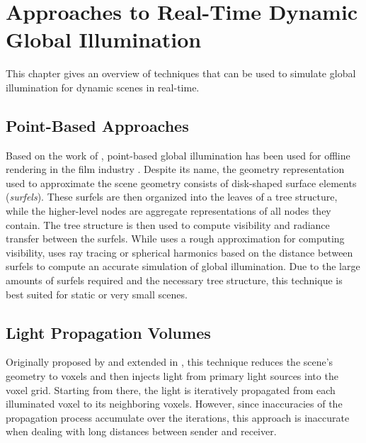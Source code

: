 
\chapter{Approaches to Real-Time Dynamic Global Illumination}

This chapter gives an overview of techniques that can be used to simulate global illumination for dynamic scenes in real-time.



\section{Point-Based Approaches}

Based on the work of \citet{Bunnell:2005:AO}, point-based global illumination has been used for offline rendering in the film industry \citep{christensen2008point}.
Despite its name, the geometry representation used to approximate the scene geometry consists of disk-shaped surface elements (\emph{surfels}).
These surfels are then organized into the leaves of a tree structure, while the higher-level nodes are aggregate representations of all nodes they contain.
The tree structure is then used to compute visibility and radiance transfer between the surfels.
While \citet{Bunnell:2005:AO} uses a rough approximation for computing visibility, \citet{christensen2008point} uses ray tracing or spherical harmonics based on the distance between surfels to compute an accurate simulation of global illumination.
Due to the large amounts of surfels required and the necessary tree structure, this technique is best suited for static or very small scenes.



\section{Light Propagation Volumes}

Originally proposed by \citet{Kaplanyan:2010:LPV} and extended in \citep{Kaplanyan:2010:LPV2}, this technique reduces the scene's geometry to voxels and then injects light from primary light sources into the voxel grid. Starting from there, the light is iteratively propagated from each illuminated voxel to its neighboring voxels. However, since inaccuracies of the propagation process accumulate over the iterations, this approach is inaccurate when dealing with long distances between sender and receiver.


